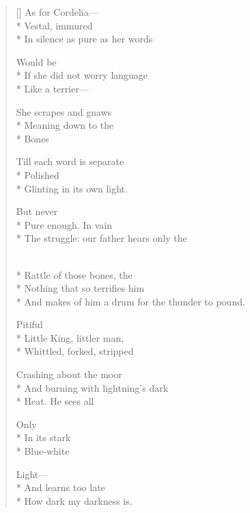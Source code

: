 \label{ch:lear_ah}
\settowidth{\versewidth}{And makes of him a drum for the thunder to pound.}
\begin{verse}[\versewidth]
As for Cordelia---\\*
Vestal, immured\\*
In silence as pure as her words

Would be\\*
If she did not worry language\\*
\hspace*{3\vgap} Like a terrier---

She scrapes and gnaws\\*
Meaning down to the\\*
Bones

\hspace*{3\vgap} Till each word is separate\\*
Polished\\*
Glinting in its own light.

But never\\*
Pure enough.  In vain\\*
The struggle: our father hears only the

\\*
Rattle of those bones, the\\*
Nothing that so terrifies him\\*
And makes of him a drum for the thunder to pound.

Pitiful\\*
Little King, littler man,\\*
Whittled, forked, stripped

Crashing about the moor\\*
And burning with lightning's dark\\*
Heat.     He sees all

Only\\*
In its stark\\*
Blue-white

Light---\\*
And learns too late\\*
\hspace*{3\vgap} How dark my darkness is.
\end{verse}
